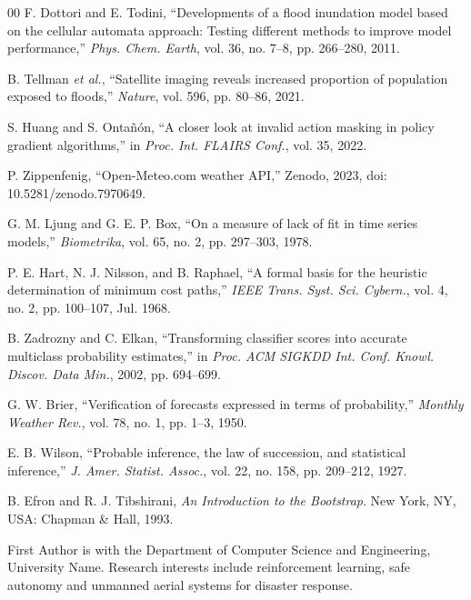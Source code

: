 \documentclass{ieeeaccess}
\begin{document}
\begin{thebibliography}{00}
 F. Dottori and E. Todini, ``Developments of a flood inundation model based on the cellular automata approach: Testing different methods to improve model performance,'' \emph{Phys. Chem. Earth}, vol. 36, no. 7--8, pp. 266--280, 2011.

 B. Tellman \emph{et al.}, ``Satellite imaging reveals increased proportion of population exposed to floods,'' \emph{Nature}, vol. 596, pp. 80--86, 2021.

 S. Huang and S. Onta\~{n}\'{o}n, ``A closer look at invalid action masking in policy gradient algorithms,'' in \emph{Proc. Int. FLAIRS Conf.}, vol. 35, 2022.

 P. Zippenfenig, ``Open-Meteo.com weather API,'' Zenodo, 2023, doi: 10.5281/zenodo.7970649.

 G. M. Ljung and G. E. P. Box, ``On a measure of lack of fit in time series models,'' \emph{Biometrika}, vol. 65, no. 2, pp. 297--303, 1978.

 P. E. Hart, N. J. Nilsson, and B. Raphael, ``A formal basis for the heuristic determination of minimum cost paths,'' \emph{IEEE Trans. Syst. Sci. Cybern.}, vol. 4, no. 2, pp. 100--107, Jul. 1968.

 B. Zadrozny and C. Elkan, ``Transforming classifier scores into accurate multiclass probability estimates,'' in \emph{Proc. ACM SIGKDD Int. Conf. Knowl. Discov. Data Min.}, 2002, pp. 694--699.

 G. W. Brier, ``Verification of forecasts expressed in terms of probability,'' \emph{Monthly Weather Rev.}, vol. 78, no. 1, pp. 1--3, 1950.

 E. B. Wilson, ``Probable inference, the law of succession, and statistical inference,'' \emph{J. Amer. Statist. Assoc.}, vol. 22, no. 158, pp. 209--212, 1927.

 B. Efron and R. J. Tibshirani, \emph{An Introduction to the Bootstrap}. New York, NY, USA: Chapman \& Hall, 1993.

\end{thebibliography}

\begin{IEEEbiography}{First Author} is with the Department of Computer Science and Engineering, University Name. Research interests include reinforcement learning, safe autonomy and unmanned aerial systems for disaster response.
\end{IEEEbiography}
\end{document}
